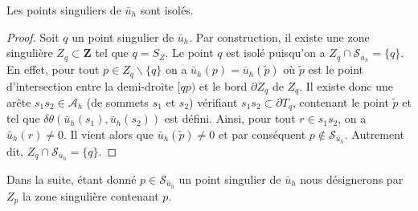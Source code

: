 \begin{lemma}
\label{lem:isolation_pt_sing}
    Les points singuliers de $\bar{u}_h$ sont isolés.
\end{lemma}
\begin{proof}
    Soit $q$ un point singulier de $\bar{u}_h$. Par construction, il existe une zone singulière $Z_q\subset\mathbf{Z}$ tel que $q=S_Z$. Le point $q$ est isolé puisqu'on a $Z_q\cap\mathcal{S}_{\bar{u}_h}=\{q\}$. En effet, pour tout $p\in Z_q\backslash\{q\}$ on a $\bar{u}_h(p)=\bar{u}_h(\widetilde{p})$ où $\widetilde{p}$ est le point d'intersection entre la demi-droite $[qp)$ et le bord $\partial Z_q$ de $Z_q$. Il existe donc une arête $s_1s_2\in\mathcal{A}_h$ (de sommets $s_1$ et $s_2$) vérifiant $s_1s_2\subset\partial T_q$, contenant le point $\widetilde{p}$ et tel que $\delta\theta(\bar{u}_h(s_1), \bar{u}_h(s_2))$ est défini. Ainsi, pour tout $r\in s_1s_2$, on a $\bar{u}_h(r)\neq 0$. Il vient alors que $\bar{u}_h(\widetilde{p})\neq 0$ et par conséquent $p\notin \mathcal{S}_{\bar{u}_h}$. Autrement dit, $Z_q\cap\mathcal{S}_{\bar{u}_h}=\{q\}$.
\end{proof}
Dans la suite, étant donné $p\in\mathcal{S}_{\bar{u}_h}$ un point singulier de $\bar{u}_h$ nous désignerons par $Z_p$ la zone singulière contenant $p$.\\

